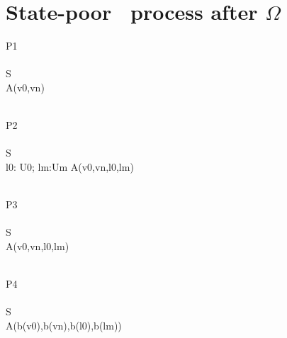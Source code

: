 \section{State-poor \Circus\ process after $\Omega$}

\begin{circus}
\circprocess P1
\circdef\\ 
\circbegin\\ 
			\circstate S \\ 
			\circspot A(v0,vn)\\
	\circend\\
\end{circus}

\begin{circus}
\circprocess P2\circdef\\ 
		\circbegin\\ 
			\circstate S \\ 
			\circspot \circvar l0: U0; lm:Um \circspot A(v0,vn,l0,lm)\\
	\circend\\
\end{circus}

\begin{circus}
\circprocess P3\circdef\\ 
		\circbegin\\ 
			\circstate S \\ 
			\circspot A(v0,vn,l0,lm)\\
	\circend\\
\end{circus}

\begin{circus}
\circprocess P4\circdef\\ 
		\circbegin\\ 
			\circstate S \\ 
			\circspot A(b(v0),b(vn),b(l0),b(lm)) \\
	\circend\\
\end{circus}


